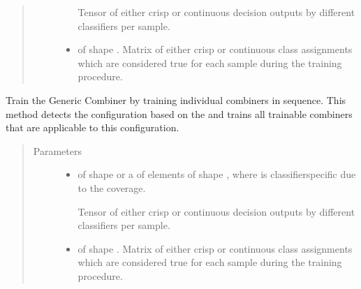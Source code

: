 \documentclass[letterpaper,10pt,english]{sphinxmanual}
\begin{document}
\begin{fulllineitems}
\begin{fulllineitems}
\begin{quote}
\begin{description}
\begin{itemize}
\sphinxAtStartPar
Tensor of either crisp or continuous decision outputs by different classifiers per sample.


\item {} 
\sphinxAtStartPar
{} \textendash{}  of shape .
Matrix of either crisp or continuous class assignments which are considered true for each sample during
the training procedure.

\end{itemize}

\end{description}\end{quote}

\end{fulllineitems}


\begin{fulllineitems}
\label{\detokenize{pusion.auto.auto_combiner:pusion.auto.auto_combiner.AutoCombiner.train_seq}}
\sphinxAtStartPar
Train the Generic Combiner by training individual combiners in sequence.
This method detects the configuration based on the  and trains all trainable combiners
that are applicable to this configuration.
\begin{quote}\begin{description}
\item[{Parameters}] \leavevmode\begin{itemize}
\item {} 
\sphinxAtStartPar
{} \textendash{} 
\sphinxAtStartPar
{} of shape  or a  of
 elements of shape , where  is classifier\sphinxhyphen{}specific
due to the coverage.

\sphinxAtStartPar
Tensor of either crisp or continuous decision outputs by different classifiers per sample.


\item {} 
\sphinxAtStartPar
{} \textendash{}  of shape .
Matrix of either crisp or continuous class assignments which are considered true for each sample during
the training procedure.


\end{itemize}
\end{description}
\end{quote}
\end{fulllineitems}
\end{fulllineitems}
\end{document}

